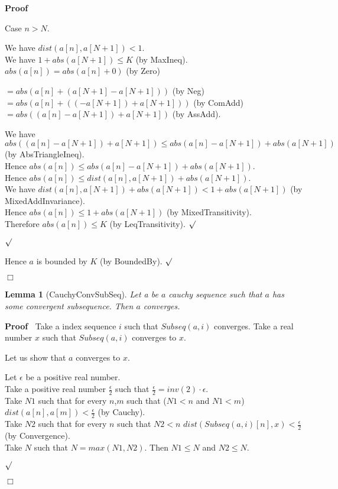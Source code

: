 \documentclass{article}
\newenvironment{forthel}{\begin{leftbar}}{\end{leftbar}}
\newenvironment{proof}{\noindent\textbf{Proof\ }}{\hspace*{\fill}$\Box$\medskip}
\newenvironment{subproof}{\begin{list}{}{}
		\item[\text{Proof}]}{\hfill $\surd$ \end{list}}
\newtheorem{lemma}{Lemma}
\newcommand{\halfeps}{\frac{\epsilon}{2}}
\newcommand{\dotequal}{=}
\begin{document}
\begin{forthel}
\begin{proof}
\begin{subproof}
\begin{subproof}
				Case $n > N$.
				
				\begin{subproof}
					We have $dist(a[n],a[N + 1]) < 1$.\\
					We have $1 + abs(a[N + 1]) \leq K$ (by MaxIneq).\\
					$abs(a[n]) \dotequal abs(a[n] + 0)$ (by Zero)
					
					$\dotequal abs(a[n] + (a[N + 1] - a[N + 1]))$ (by Neg)\\
					$\dotequal abs(a[n] + ((-a[N + 1]) + a[N + 1]))$ (by ComAdd)\\
					$\dotequal abs((a[n] - a[N + 1]) + a[N + 1])$ (by AssAdd).
					
					We have $abs((a[n] - a[N + 1]) + a[N + 1]) \leq abs(a[n] - a[N + 1]) + abs(a[N + 1])$ (by AbsTriangleIneq).\\
					Hence $abs(a[n]) \leq abs(a[n] - a[N + 1]) + abs(a[N + 1])$.\\
					Hence $abs(a[n]) \leq dist(a[n],a[N + 1]) + abs(a[N + 1])$.\\
					We have $dist(a[n],a[N + 1]) + abs(a[N + 1]) < 1 + abs(a[N + 1])$ (by MixedAddInvariance).\\
					Hence $abs(a[n]) \leq 1 + abs(a[N + 1])$ (by MixedTransitivity).\\
					Therefore $abs(a[n]) \leq K$ (by LeqTransitivity).
				\end{subproof}
			\end{subproof}
			Hence $a$ is bounded by $K$ (by BoundedBy).
		\end{subproof}
	\end{proof}
	
	\begin{lemma}[CauchyConvSubSeq]
		Let a be $a$ cauchy sequence such that $a$ has some convergent subsequence. Then $a$ converges.
	\end{lemma}
	
	\begin{proof}
		Take a index sequence $i$ such that $Subseq(a,i)$ converges.
		Take a real number $x$ such that $Subseq(a,i)$ converges to $x$.
		
		\noindent Let us show that $a$ converges to $x$.
		\begin{subproof}
			Let $\epsilon$ be a positive real number.\\			
			Take a positive real number $\halfeps$ such that $\halfeps = inv(2) \cdot \epsilon$.\\
			Take $N1$ such that for every $n$,$m$ such that ($N1 < n$ and $N1 < m$) $dist(a[n],a[m]) < \halfeps$ (by Cauchy).\\
			Take $N2$ such that for every $n$ such that $N2 < n$ $dist(Subseq(a,i)[n],x) < \halfeps$ (by Convergence).\\
			Take $N$ such that $N = max(N1,N2)$. Then $N1 \leq N$ and $N2 \leq N$.
			

\end{subproof}
\end{proof}
\end{forthel}
\end{document}

